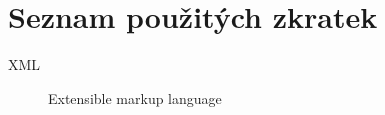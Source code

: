 \chapter{Seznam použitých zkratek}
\begin{description}
	\item[XML] Extensible markup language
\end{description}